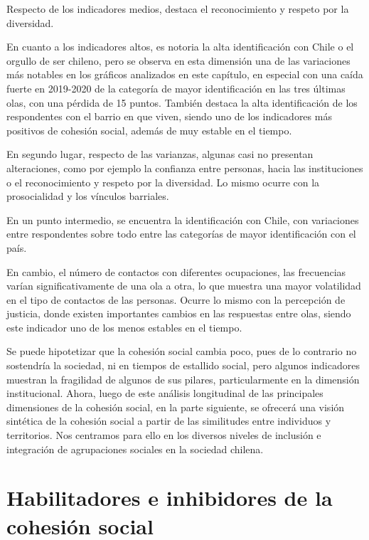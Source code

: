 \documentclass[
  12pt,
]{book}
\begin{document}
Respecto de los indicadores medios, destaca el reconocimiento y respeto por la diversidad.

En cuanto a los indicadores altos, es notoria la alta identificación con Chile o el orgullo de ser chileno, pero se observa en esta dimensión una de las variaciones más notables en los gráficos analizados en este capítulo, en especial con una caída fuerte en 2019-2020 de la categoría de mayor identificación en las tres últimas olas, con una pérdida de 15 puntos. También destaca la alta identificación de los respondentes con el barrio en que viven, siendo uno de los indicadores más positivos de cohesión social, además de muy estable en el tiempo.

En segundo lugar, respecto de las varianzas, algunas casi no presentan alteraciones, como por ejemplo la confianza entre personas, hacia las instituciones o el reconocimiento y respeto por la diversidad. Lo mismo ocurre con la prosocialidad y los vínculos barriales.

En un punto intermedio, se encuentra la identificación con Chile, con variaciones entre respondentes sobre todo entre las categorías de mayor identificación con el país.

En cambio, el número de contactos con diferentes ocupaciones, las frecuencias varían significativamente de una ola a otra, lo que muestra una mayor volatilidad en el tipo de contactos de las personas. Ocurre lo mismo con la percepción de justicia, donde existen importantes cambios en las respuestas entre olas, siendo este indicador uno de los menos estables en el tiempo.

Se puede hipotetizar que la cohesión social cambia poco, pues de lo contrario no sostendría la sociedad, ni en tiempos de estallido social, pero algunos indicadores muestran la fragilidad de algunos de sus pilares, particularmente en la dimensión institucional. Ahora, luego de este análisis longitudinal de las principales dimensiones de la cohesión social, en la parte siguiente, se ofrecerá una visión sintética de la cohesión social a partir de las similitudes entre individuos y territorios. Nos centramos para ello en los diversos niveles de inclusión e integración de agrupaciones sociales en la sociedad chilena.

\hypertarget{habilitadores-e-inhibidores-de-la-cohesiuxf3n-social}{%
\chapter{Habilitadores e inhibidores de la cohesión social}\label{habilitadores-e-inhibidores-de-la-cohesiuxf3n-social}}
\end{document}

